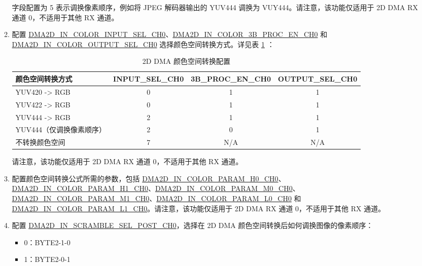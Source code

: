 \documentclass[main\_\_CN.tex]{subfiles}
\begin{document}
\begin{enumerate}
\begin{enumerate}
\begin{itemize}
        \end{itemize}
        字段配置为 5 表示调换像素顺序，例如将 JPEG 解码器输出的 YUV444 调换为 VUY444。请注意，该功能仅适用于 2D DMA RX 通道 0，不适用于其他 RX 通道。
        \item 配置 \hyperref[fielddesc:DMA2DINCOLORINPUTSELCH0]{DMA2D\_IN\_COLOR\_INPUT\_SEL\_CH0}、\hyperref[fielddesc:DMA2DINCOLOR3BPROCENCH0]{DMA2D\_IN\_COLOR\_3B\_PROC\_EN\_CH0} 和 \hyperref[fielddesc:DMA2DINCOLOROUTPUTSELCH0]{DMA2D\_IN\_COLOR\_OUTPUT\_SEL\_CH0} 选择颜色空间转换方式。详见表 \ref{tab:de_csc} \textit{}：
        \begin{longtable}{ | l | c | c | c | }
        \caption{2D DMA 颜色空间转换配置} \label{tab:de_csc}
        \\ \hline
        \rowcolor{lightgray}
        \textbf{颜色空间转换方式} & \textbf{INPUT\_SEL\_CH0}  &  \textbf{3B\_PROC\_EN\_CH0} &  \textbf{OUTPUT\_SEL\_CH0}  \\ \hline
        YUV420 -> RGB &  0  &  1  &  1 \\ \hline
        YUV422 -> RGB &  0  &  1  &  1 \\ \hline
        YUV444 -> RGB &  2  &  1  &  1 \\ \hline
        YUV444（仅调换像素顺序） &  2  &  0  &  1 \\ \hline
        不转换颜色空间 &  7  &  N/A  &  N/A \\ \hline
        \end{longtable}
        请注意，该功能仅适用于 2D DMA RX 通道 0，不适用于其他 RX 通道。
        \item 配置颜色空间转换公式所需的参数，包括 \hyperref[fielddesc:DMA2DINCOLORPARAMH0CH0]{DMA2D\_IN\_COLOR\_PARAM\_H0\_CH0}、\hyperref[fielddesc:DMA2DINCOLORPARAMH1CH0]{DMA2D\_IN\_COLOR\_PARAM\_H1\_CH0}、\hyperref[fielddesc:DMA2DINCOLORPARAMM0CH0]{DMA2D\_IN\_COLOR\_PARAM\_M0\_CH0}、\hyperref[fielddesc:DMA2DINCOLORPARAMM1CH0]{DMA2D\_IN\_COLOR\_PARAM\_M1\_CH0}、\hyperref[fielddesc:DMA2DINCOLORPARAML0CH0]{DMA2D\_IN\_COLOR\_PARAM\_L0\_CH0} 和 \hyperref[fielddesc:DMA2DINCOLORPARAML1CH0]{DMA2D\_IN\_COLOR\_PARAM\_L1\_CH0}。请注意，该功能仅适用于 2D DMA RX 通道 0，不适用于其他 RX 通道。
        \item 配置 \hyperref[fielddesc:DMA2DINSCRAMBLESELPOSTCH0]{DMA2D\_IN\_SCRAMBLE\_SEL\_POST\_CH0}，选择在 2D DMA 颜色空间转换后如何调换图像的像素顺序：
        \begin{itemize}
            \item 0：BYTE2-1-0
            \item 1：BYTE2-0-1

\end{itemize}
\end{enumerate}
\end{enumerate}
\end{document}
